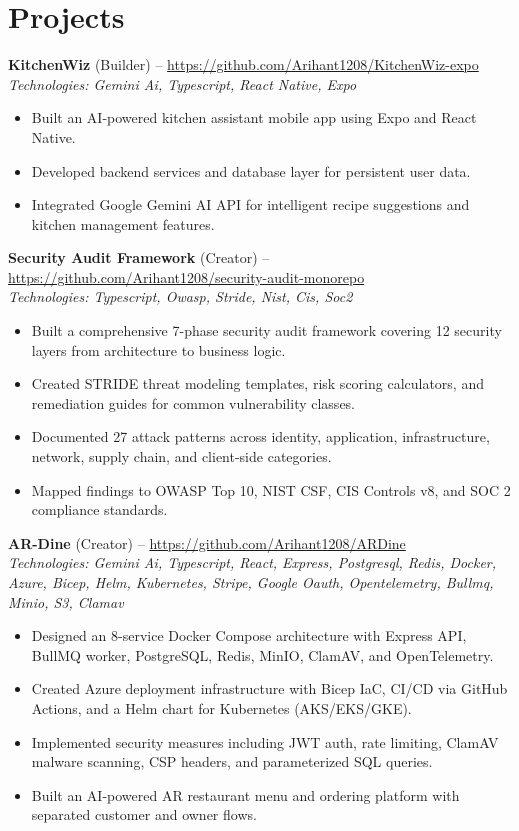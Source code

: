 \documentclass[11pt,a4paper]{article}
\begin{document}
\section{Projects}
\textbf{KitchenWiz} (Builder) -- \href{https://github.com/Arihant1208/KitchenWiz-expo}{https://github.com/Arihant1208/KitchenWiz-expo}
\\ \textit{Technologies: Gemini Ai, Typescript, React Native, Expo}
\begin{itemize}
  \item Built an AI-powered kitchen assistant mobile app using Expo and React Native.
  \item Developed backend services and database layer for persistent user data.
  \item Integrated Google Gemini AI API for intelligent recipe suggestions and kitchen management features.
\end{itemize}
\vspace{2pt}
\textbf{Security Audit Framework} (Creator) -- \href{https://github.com/Arihant1208/security-audit-monorepo}{https://github.com/Arihant1208/security-audit-monorepo}
\\ \textit{Technologies: Typescript, Owasp, Stride, Nist, Cis, Soc2}
\begin{itemize}
  \item Built a comprehensive 7-phase security audit framework covering 12 security layers from architecture to business logic.
  \item Created STRIDE threat modeling templates, risk scoring calculators, and remediation guides for common vulnerability classes.
  \item Documented 27 attack patterns across identity, application, infrastructure, network, supply chain, and client-side categories.
  \item Mapped findings to OWASP Top 10, NIST CSF, CIS Controls v8, and SOC 2 compliance standards.
\end{itemize}
\vspace{2pt}
\textbf{AR-Dine} (Creator) -- \href{https://github.com/Arihant1208/ARDine}{https://github.com/Arihant1208/ARDine}
\\ \textit{Technologies: Gemini Ai, Typescript, React, Express, Postgresql, Redis, Docker, Azure, Bicep, Helm, Kubernetes, Stripe, Google Oauth, Opentelemetry, Bullmq, Minio, S3, Clamav}
\begin{itemize}
  \item Designed an 8-service Docker Compose architecture with Express API, BullMQ worker, PostgreSQL, Redis, MinIO, ClamAV, and OpenTelemetry.
  \item Created Azure deployment infrastructure with Bicep IaC, CI/CD via GitHub Actions, and a Helm chart for Kubernetes (AKS/EKS/GKE).
  \item Implemented security measures including JWT auth, rate limiting, ClamAV malware scanning, CSP headers, and parameterized SQL queries.
  \item Built an AI-powered AR restaurant menu and ordering platform with separated customer and owner flows.
\end{itemize}
\vspace{2pt}
\end{document}

